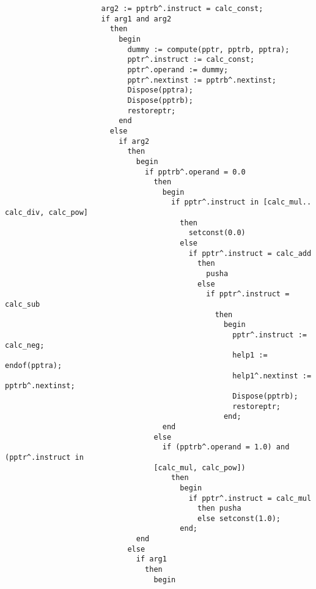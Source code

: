 \begin{refsection}
\begin{lstlisting}
                      arg2 := pptrb^.instruct = calc_const;
                      if arg1 and arg2
                        then
                          begin
                            dummy := compute(pptr, pptrb, pptra);
                            pptr^.instruct := calc_const;
                            pptr^.operand := dummy;
                            pptr^.nextinst := pptrb^.nextinst;
                            Dispose(pptra);
                            Dispose(pptrb);
                            restoreptr;
                          end
                        else
                          if arg2
                            then
                              begin
                                if pptrb^.operand = 0.0
                                  then
                                    begin
                                      if pptr^.instruct in [calc_mul.. calc_div, calc_pow]
                                        then
                                          setconst(0.0)
                                        else
                                          if pptr^.instruct = calc_add
                                            then
                                              pusha
                                            else
                                              if pptr^.instruct = calc_sub
                                                then
                                                  begin
                                                    pptr^.instruct := calc_neg;
                                                    help1 := endof(pptra);
                                                    help1^.nextinst := pptrb^.nextinst;
                                                    Dispose(pptrb);
                                                    restoreptr;
                                                  end;
                                    end
                                  else
                                    if (pptrb^.operand = 1.0) and (pptr^.instruct in
                                  [calc_mul, calc_pow])
                                      then
                                        begin
                                          if pptr^.instruct = calc_mul
                                            then pusha
                                            else setconst(1.0);
                                        end;
                              end
                            else
                              if arg1
                                then
                                  begin

\end{lstlisting}
\end{refsection}
